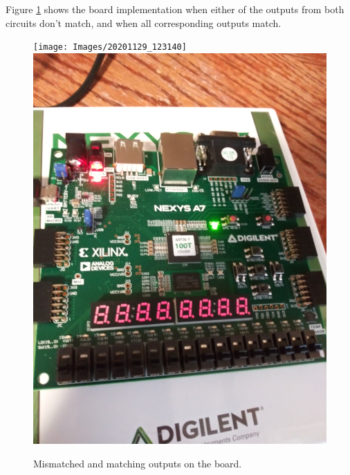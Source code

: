 \documentclass{article}
\begin{document}
Figure \ref{picture:board} shows the board implementation
when either of the outputs from both circuits don't match,
and when all corresponding outputs match.

\begin{figure}[H]
    \centering
    \texttt{[image: Images/20201129\_123140]}
    \includegraphics[height=0.49\textwidth, angle=-90]{Images/20201129_123208}
    \caption{Mismatched and matching outputs on the board.}
    \label{picture:board}
\end{figure}
\end{document}
